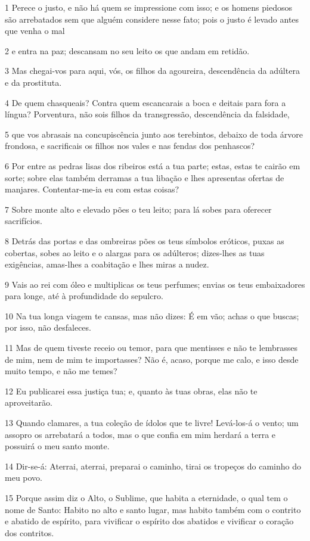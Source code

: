 \par 1 Perece o justo, e não há quem se impressione com isso; e os homens piedosos são arrebatados sem que alguém considere nesse fato; pois o justo é levado antes que venha o mal
\par 2 e entra na paz; descansam no seu leito os que andam em retidão.
\par 3 Mas chegai-vos para aqui, vós, os filhos da agoureira, descendência da adúltera e da prostituta.
\par 4 De quem chasqueais? Contra quem escancarais a boca e deitais para fora a língua? Porventura, não sois filhos da transgressão, descendência da falsidade,
\par 5 que vos abrasais na concupiscência junto aos terebintos, debaixo de toda árvore frondosa, e sacrificais os filhos nos vales e nas fendas dos penhascos?
\par 6 Por entre as pedras lisas dos ribeiros está a tua parte; estas, estas te cairão em sorte; sobre elas também derramas a tua libação e lhes apresentas ofertas de manjares. Contentar-me-ia eu com estas coisas?
\par 7 Sobre monte alto e elevado pões o teu leito; para lá sobes para oferecer sacrifícios.
\par 8 Detrás das portas e das ombreiras pões os teus símbolos eróticos, puxas as cobertas, sobes ao leito e o alargas para os adúlteros; dizes-lhes as tuas exigências, amas-lhes a coabitação e lhes miras a nudez.
\par 9 Vais ao rei com óleo e multiplicas os teus perfumes; envias os teus embaixadores para longe, até à profundidade do sepulcro.
\par 10 Na tua longa viagem te cansas, mas não dizes: É em vão; achas o que buscas; por isso, não desfaleces.
\par 11 Mas de quem tiveste receio ou temor, para que mentisses e não te lembrasses de mim, nem de mim te importasses? Não é, acaso, porque me calo, e isso desde muito tempo, e não me temes?
\par 12 Eu publicarei essa justiça tua; e, quanto às tuas obras, elas não te aproveitarão.
\par 13 Quando clamares, a tua coleção de ídolos que te livre! Levá-los-á o vento; um assopro os arrebatará a todos, mas o que confia em mim herdará a terra e possuirá o meu santo monte.
\par 14 Dir-se-á: Aterrai, aterrai, preparai o caminho, tirai os tropeços do caminho do meu povo.
\par 15 Porque assim diz o Alto, o Sublime, que habita a eternidade, o qual tem o nome de Santo: Habito no alto e santo lugar, mas habito também com o contrito e abatido de espírito, para vivificar o espírito dos abatidos e vivificar o coração dos contritos.
